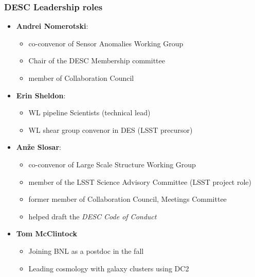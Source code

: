 \documentclass[aspectratio=169]{beamer}
\begin{document}
\begin{frame}
  \frametitle{DESC Leadership roles}

  \begin{itemize}
      \item \textbf{Andrei Nomerotski}:
          \begin{itemize}
              \item co-convenor of Sensor Anomalies Working Group
              \item Chair of the DESC Membership committee
              \item member of Collaboration Council
          \end{itemize}

      \item \textbf{Erin Sheldon}:
          \begin{itemize}
              \item WL pipeline Scientists (technical lead)
              \item WL shear group convenor in DES (LSST precursor)
          \end{itemize}

      \item \textbf{An\v{z}e Slosar}: 
          \begin{itemize}
              \item co-convenor of Large Scale Structure Working Group
              \item member of the LSST Science Advisory Committee (LSST project role)
              \item former member of Collaboration Council, Meetings Committee
              \item helped draft the \emph {DESC Code of Conduct}

        \end{itemize}

    \item \textbf{Tom McClintock}
        \begin{itemize}
            \item Joining BNL as a postdoc in the fall
            \item Leading cosmology with galaxy
                clusters using DC2
        \end{itemize}


\end{itemize}

\end{frame}
\end{document}
